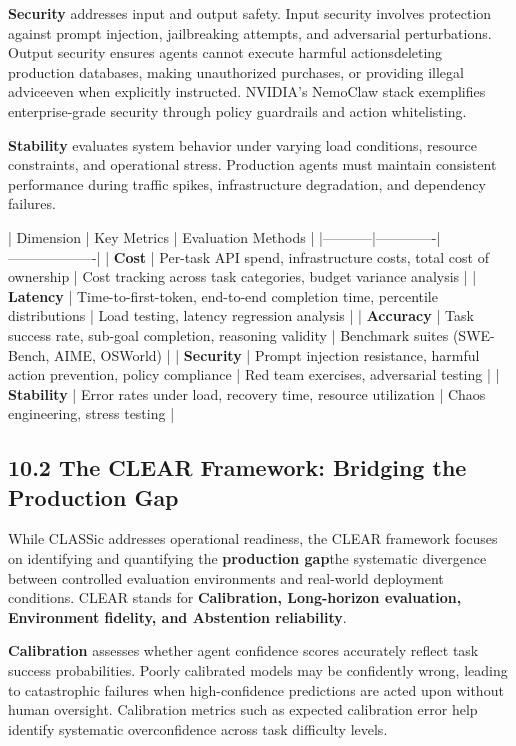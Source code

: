 \textbf{Security} addresses input and output safety. Input security involves protection against prompt injection, jailbreaking attempts, and adversarial perturbations. Output security ensures agents cannot execute harmful actionsdeleting production databases, making unauthorized purchases, or providing illegal adviceeven when explicitly instructed. NVIDIA's NemoClaw stack exemplifies enterprise-grade security through policy guardrails and action whitelisting.

\textbf{Stability} evaluates system behavior under varying load conditions, resource constraints, and operational stress. Production agents must maintain consistent performance during traffic spikes, infrastructure degradation, and dependency failures.

| Dimension | Key Metrics | Evaluation Methods |
|-----------|-------------|-------------------|
| \textbf{Cost} | Per-task API spend, infrastructure costs, total cost of ownership | Cost tracking across task categories, budget variance analysis |
| \textbf{Latency} | Time-to-first-token, end-to-end completion time, percentile distributions | Load testing, latency regression analysis |
| \textbf{Accuracy} | Task success rate, sub-goal completion, reasoning validity | Benchmark suites (SWE-Bench, AIME, OSWorld) |
| \textbf{Security} | Prompt injection resistance, harmful action prevention, policy compliance | Red team exercises, adversarial testing |
| \textbf{Stability} | Error rates under load, recovery time, resource utilization | Chaos engineering, stress testing |

\subsection{10.2 The CLEAR Framework: Bridging the Production Gap}

While CLASSic addresses operational readiness, the CLEAR framework focuses on identifying and quantifying the \textbf{production gap}the systematic divergence between controlled evaluation environments and real-world deployment conditions. CLEAR stands for \textbf{Calibration, Long-horizon evaluation, Environment fidelity, and Abstention reliability}.

\textbf{Calibration} assesses whether agent confidence scores accurately reflect task success probabilities. Poorly calibrated models may be confidently wrong, leading to catastrophic failures when high-confidence predictions are acted upon without human oversight. Calibration metrics such as expected calibration error help identify systematic overconfidence across task difficulty levels.

